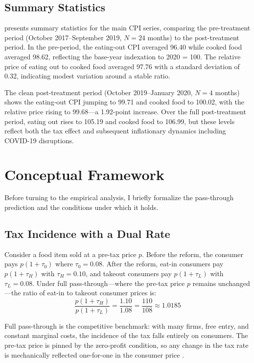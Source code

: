 \documentclass[12pt]{article}
\begin{document}
\subsection{Summary Statistics}

 presents summary statistics for the main CPI series, comparing the pre-treatment period (October 2017--September 2019, $N = 24$ months) to the post-treatment period. In the pre-period, the eating-out CPI averaged 96.40 while cooked food averaged 98.62, reflecting the base-year indexation to 2020 = 100. The relative price of eating out to cooked food averaged 97.76 with a standard deviation of 0.32, indicating modest variation around a stable ratio.

The clean post-treatment period (October 2019--January 2020, $N = 4$ months) shows the eating-out CPI jumping to 99.71 and cooked food to 100.02, with the relative price rising to 99.68---a 1.92-point increase. Over the full post-treatment period, eating out rises to 105.19 and cooked food to 106.99, but these levels reflect both the tax effect and subsequent inflationary dynamics including COVID-19 disruptions.




\section{Conceptual Framework}
\label{sec:framework}

Before turning to the empirical analysis, I briefly formalize the pass-through prediction and the conditions under which it holds.

\subsection{Tax Incidence with a Dual Rate}

Consider a food item sold at a pre-tax price $p$. Before the reform, the consumer pays $p(1 + \tau_0)$ where $\tau_0 = 0.08$. After the reform, eat-in consumers pay $p(1 + \tau_H)$ with $\tau_H = 0.10$, and takeout consumers pay $p(1 + \tau_L)$ with $\tau_L = 0.08$. Under full pass-through---where the pre-tax price $p$ remains unchanged---the ratio of eat-in to takeout consumer prices is:
\begin{equation}
\frac{p(1 + \tau_H)}{p(1 + \tau_L)} = \frac{1.10}{1.08} = \frac{110}{108} \approx 1.0185
\end{equation}

Full pass-through is the competitive benchmark: with many firms, free entry, and constant marginal costs, the incidence of the tax falls entirely on consumers. The pre-tax price is pinned by the zero-profit condition, so any change in the tax rate is mechanically reflected one-for-one in the consumer price \citep{fullerton2012tax}.
\end{document}
